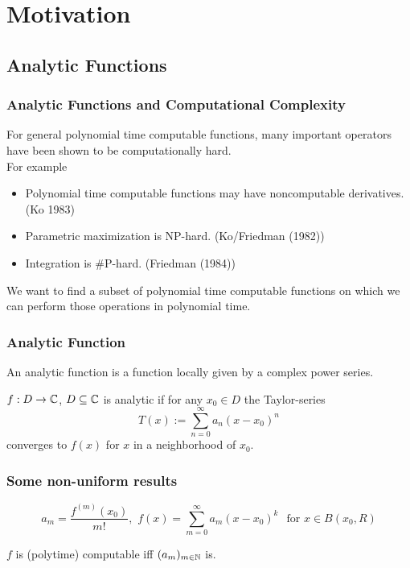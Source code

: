 \section{Motivation}
\subsection{Analytic Functions}
\begin{frame}
\frametitle{Analytic Functions and Computational Complexity}
\begin{fact}
For general polynomial time computable functions, many important operators have been shown to be computationally hard.\\
For example
\begin{itemize}[<+->]
\item Polynomial time computable functions may have noncomputable derivatives. (Ko 1983)
\item Parametric maximization is NP-hard. (Ko/Friedman (1982))
\item Integration is \#P-hard. (Friedman (1984))
\end{itemize}
\end{fact}
\pause
We want to find a subset of polynomial time computable functions on which we can perform those operations in polynomial time.
\end{frame}
\begin{frame}
\frametitle{Analytic Function}
An analytic function is a function locally given by a complex power series.\\
\begin{definition}
$f : D \to \mathbb{C} $, $D \subseteq \mathbb{C}$ is analytic if for any $x_0 \in D$ the Taylor-series
$$ T(x) := \sum^\infty_{n=0} a_n(x-x_0)^n$$
converges to $f(x)$ for $x$ in a neighborhood of $x_0$.  
\end{definition}
\end{frame}
\begin{frame}
\frametitle{Some non-uniform results}

$$a_m =\frac{f^{(m)}(x_0)}{m!} 
, \,\, f(x) = \sum_{m=0}^\infty a_m(x-x_0)^k \,\ \text{ for } x \in B(x_0,R)
$$
\vfill
\begin{theorem}
$f$ is (polytime) computable iff $(a_m)_{m \in \mathbb{N}}$ is.
\end{theorem}
\end{frame}
